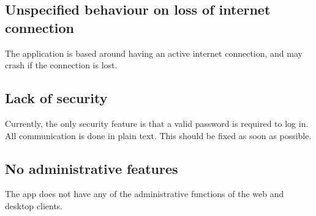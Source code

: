 \subsection{Unspecified behaviour on loss of internet connection}
The application is based around having an active internet connection, and may crash if the connection is lost.

\subsection{Lack of security}
Currently, the only security feature is that a valid password is required to log in. All communication is done in plain text. This should be fixed as soon as possible.  

\subsection{No administrative features}
The app does not have any of the administrative functions of the web and desktop clients.
